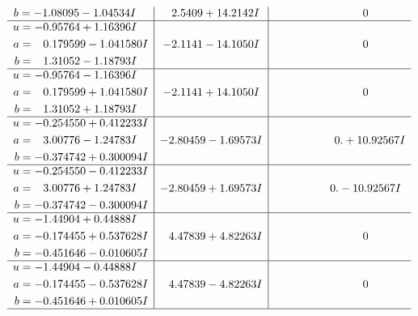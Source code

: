 \documentclass[1p]{elsarticle_modified}
\theoremstyle{definition}
\begin{document}
$$\begin{array}{c|c|c}
\begin{aligned}
b &= -1.08095 - 1.04534 I\end{aligned}
 & \phantom{-}2.5409 + 14.2142 I & \phantom{-0.000000 } 0 \\ \hline\begin{aligned}
u &= -0.95764 + 1.16396 I \\
a &= \phantom{-}0.179599 - 1.041580 I \\
b &= \phantom{-}1.31052 - 1.18793 I\end{aligned}
 & -2.1141 - 14.1050 I & \phantom{-0.000000 } 0 \\ \hline\begin{aligned}
u &= -0.95764 - 1.16396 I \\
a &= \phantom{-}0.179599 + 1.041580 I \\
b &= \phantom{-}1.31052 + 1.18793 I\end{aligned}
 & -2.1141 + 14.1050 I & \phantom{-0.000000 } 0 \\ \hline\begin{aligned}
u &= -0.254550 + 0.412233 I \\
a &= \phantom{-}3.00776 - 1.24783 I \\
b &= -0.374742 + 0.300094 I\end{aligned}
 & -2.80459 - 1.69573 I & \phantom{-0.000000 -}0. + 10.92567 I \\ \hline\begin{aligned}
u &= -0.254550 - 0.412233 I \\
a &= \phantom{-}3.00776 + 1.24783 I \\
b &= -0.374742 - 0.300094 I\end{aligned}
 & -2.80459 + 1.69573 I & \phantom{-0.000000 } 0. - 10.92567 I \\ \hline\begin{aligned}
u &= -1.44904 + 0.44888 I \\
a &= -0.174455 + 0.537628 I \\
b &= -0.451646 - 0.010605 I\end{aligned}
 & \phantom{-}4.47839 + 4.82263 I & \phantom{-0.000000 } 0 \\ \hline\begin{aligned}
u &= -1.44904 - 0.44888 I \\
a &= -0.174455 - 0.537628 I \\
b &= -0.451646 + 0.010605 I\end{aligned}
 & \phantom{-}4.47839 - 4.82263 I & \phantom{-0.000000 } 0\\
 \hline 
 \end{array}$$\newpage$$\begin{array}{c|c|c}  

\end{array}$$
\end{document}
